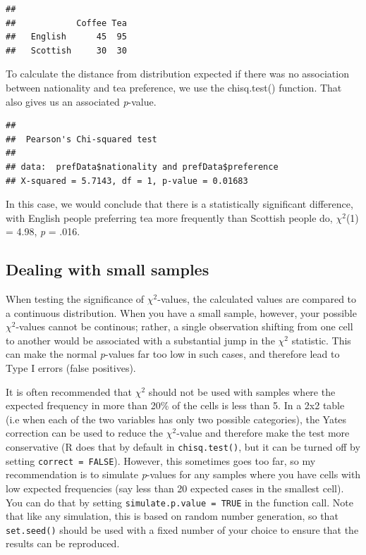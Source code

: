 \documentclass[
]{book}
\newenvironment{Shaded}{\begin{snugshade}}{\end{snugshade}}
\newcommand{\DataTypeTok}[1]{\textcolor[rgb]{0.13,0.29,0.53}{#1}}
\newcommand{\KeywordTok}[1]{\textcolor[rgb]{0.13,0.29,0.53}{\textbf{#1}}}
\newcommand{\NormalTok}[1]{#1}
\newcommand{\OperatorTok}[1]{\textcolor[rgb]{0.81,0.36,0.00}{\textbf{#1}}}
\newcommand{\OtherTok}[1]{\textcolor[rgb]{0.56,0.35,0.01}{#1}}
\begin{document}
\begin{verbatim}
##           
##            Coffee Tea
##   English      45  95
##   Scottish     30  30
\end{verbatim}

To calculate the distance from distribution expected if there was no association between nationality and tea preference, we use the chisq.test() function. That also gives us an associated \emph{p}-value.

\begin{Shaded}
\end{Shaded}

\begin{verbatim}
## 
## 	Pearson's Chi-squared test
## 
## data:  prefData$nationality and prefData$preference
## X-squared = 5.7143, df = 1, p-value = 0.01683
\end{verbatim}

In this case, we would conclude that there is a statistically significant difference, with English people preferring tea more frequently than Scottish people do, \(\chi^2\)(1) = 4.98, \emph{p} = .016.

\hypertarget{dealing-with-small-samples}{%
\subsection{Dealing with small samples}\label{dealing-with-small-samples}}

When testing the significance of \(\chi^2\)-values, the calculated values are compared to a continuous distribution. When you have a small sample, however, your possible \(\chi^2\)-values cannot be continous; rather, a single observation shifting from one cell to another would be associated with a substantial jump in the \(\chi^2\) statistic. This can make the normal \emph{p}-values far too low in such cases, and therefore lead to Type I errors (false positives).

It is often recommended that \(\chi^2\) should not be used with samples where the expected frequency in more than 20\% of the cells is less than 5. In a 2x2 table (i.e when each of the two variables has only two possible categories), the Yates correction can be used to reduce the \(\chi^2\)-value and therefore make the test more conservative (R does that by default in \texttt{chisq.test()}, but it can be turned off by setting \texttt{correct\ =\ FALSE}). However, this sometimes goes too far, so my recommendation is to simulate \emph{p}-values for any samples where you have cells with low expected frequencies (say less than 20 expected cases in the smallest cell). You can do that by setting \texttt{simulate.p.value\ =\ TRUE} in the function call. Note that like any simulation, this is based on random number generation, so that \texttt{set.seed()} should be used with a fixed number of your choice to ensure that the results can be reproduced.
\end{document}
